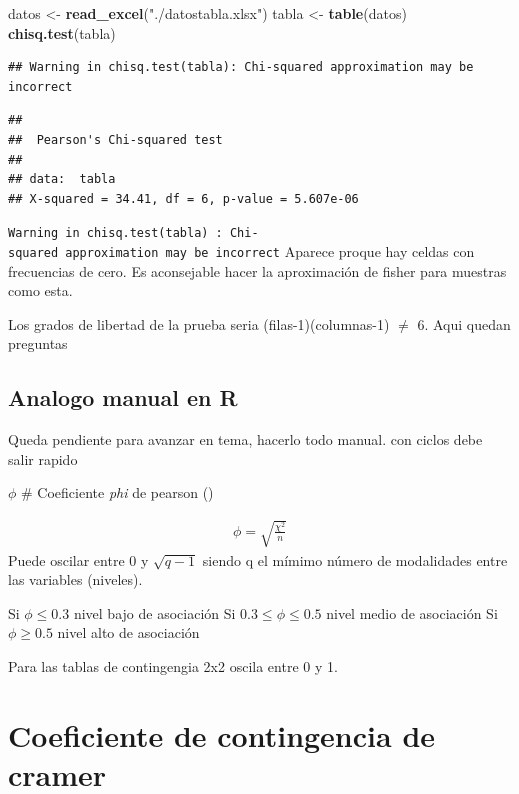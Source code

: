 \documentclass[twocolumn]{article}
\newenvironment{Shaded}{\begin{snugshade}}{\end{snugshade}}
\newcommand{\KeywordTok}[1]{\textcolor[rgb]{0.13,0.29,0.53}{\textbf{#1}}}
\newcommand{\StringTok}[1]{\textcolor[rgb]{0.31,0.60,0.02}{#1}}
\newcommand{\NormalTok}[1]{#1}
\begin{document}
\begin{Shaded}
\begin{Highlighting}[]
\NormalTok{datos <-}\StringTok{ }\KeywordTok{read_excel}\NormalTok{(}\StringTok{"./datostabla.xlsx"}\NormalTok{)}
\NormalTok{tabla <-}\StringTok{ }\KeywordTok{table}\NormalTok{(datos)}
\KeywordTok{chisq.test}\NormalTok{(tabla)}
\end{Highlighting}
\end{Shaded}

\begin{verbatim}
## Warning in chisq.test(tabla): Chi-squared approximation may be incorrect
\end{verbatim}

\begin{verbatim}
## 
##  Pearson's Chi-squared test
## 
## data:  tabla
## X-squared = 34.41, df = 6, p-value = 5.607e-06
\end{verbatim}

\texttt{Warning\ in\ chisq.test(tabla)\ :\ Chi-squared\ approximation\ may\ be\ incorrect}
Aparece proque hay celdas con frecuencias de cero. Es aconsejable hacer
la aproximación de fisher para muestras como esta.

Los grados de libertad de la prueba seria (filas-1)(columnas-1) \(\neq\)
6. Aqui quedan preguntas

\subsection{Analogo manual en R}\label{analogo-manual-en-r}

Queda pendiente para avanzar en tema, hacerlo todo manual. con ciclos
debe salir rapido

\(\phi\) \# Coeficiente \emph{phi} de pearson ()

\[
\begin{array}{c}
\phi = \sqrt{\frac{\chi^2}{n}}
\end{array}
\] Puede oscilar entre 0 y \(\sqrt{q-1}\) siendo q el mímimo número de
modalidades entre las variables (niveles).

Si \(\phi \leq 0.3\) nivel bajo de asociación Si
\(0.3 \leq \phi \leq 0.5\) nivel medio de asociación Si
\(\phi \geq 0.5\) nivel alto de asociación

Para las tablas de contingengia 2x2 oscila entre 0 y 1.

\section{Coeficiente de contingencia de
cramer}\label{coeficiente-de-contingencia-de-cramer}
\end{document}
